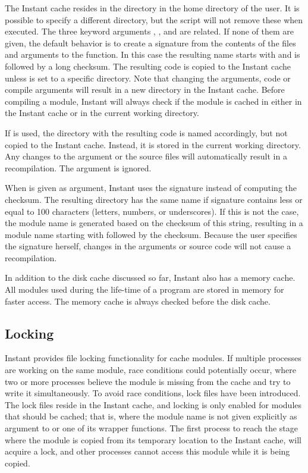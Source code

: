 The Instant cache resides in the directory  in the
home directory of the user. It is possible to specify a different directory, but the
 script will not remove these when executed.
The three keyword arguments , , and
 are related. If none of them are given, the default behavior is to
create a signature from the contents of the files and arguments to the
 function. In this case the resulting name starts with
 and is followed by a long checksum. The
resulting code is copied to the Instant cache
unless  is set to a specific directory. Note that
changing the arguments, code or compile arguments will result in a new
directory in the Instant cache.  Before compiling a module, Instant
will always check if the module is cached in either in the Instant cache or
in the current working directory.

If  is used, the directory with the resulting code is
named accordingly, but not copied to the Instant cache. Instead, it is
stored in the current working directory. Any changes to the argument
or the source files will automatically result in a recompilation. The
argument  is ignored.

When  is given as argument, Instant uses the signature
instead of computing the checksum. The resulting directory has the
same name if signature contains less or equal to 100 characters (letters, numbers, or underscores). If this is not the case, the module name is generated
based on the checksum of this string, resulting in a module name
starting with  followed by the
checksum. Because the user specifies the signature herself, changes in
the arguments or source code will not cause a recompilation.

In addition to the disk cache discussed so far, Instant also has a
memory cache. All modules used during the life-time of a program are
stored in memory for faster access. The memory cache is always checked
before the disk cache.

\subsection{Locking}

Instant provides file locking functionality for cache modules. If
multiple processes are working on the same module, race conditions
could potentially occur, where two or more processes believe the
module is missing from the cache and try to write it
simultaneously. To avoid race conditions, lock files have been
introduced. The lock files reside in the Instant cache, and locking is
only enabled for modules that should be cached; that is, where the
module name is not given explicitly as argument
to  or one of its wrapper functions. The first
process to reach the stage where the module is copied from its
temporary location to the Instant cache, will acquire a lock, and
other processes cannot access this module while it is being copied.

